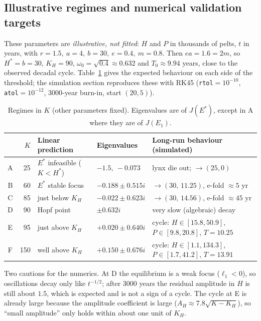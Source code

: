 \subsection{Illustrative regimes and numerical validation targets}\label{sec:joel-regimes}

These parameters are \emph{illustrative, not fitted}: $H$ and $P$ in thousands of pelts, $t$ in
years, with $r=1.5,\ a=4,\ b=30,\ e=0.4,\ m=0.8$. Then $ea=1.6=2m$, so $H^*=b=30$, $K_H=90$,
$\omega_0=\sqrt{0.4}\approx0.632$ and $T_0\approx9.94$ years, close to the observed decadal
cycle. Table~\ref{tab:joel-regimes} gives the expected behaviour on each side of the threshold;
the simulation section reproduces these with RK45 (\texttt{rtol}$=10^{-10}$,
\texttt{atol}$=10^{-12}$, 3000-year burn-in, start $(20,5)$).

\begin{table}[ht]
\centering
\small
\caption{Regimes in $K$ (other parameters fixed). Eigenvalues are of $J(E^*)$, except in A where
they are of $J(E_1)$.}
\label{tab:joel-regimes}
\setlength{\tabcolsep}{4pt}
\begin{tabular}{@{}cr l l l@{}}
\toprule
 & $K$ & Linear prediction & Eigenvalues & Long-run behaviour (simulated)\\
\midrule
A & 25  & $E^*$ infeasible ($K<H^*$) & $-1.5,\ -0.073$ & lynx die out; $\to(25,0)$\\
B & 60  & $E^*$ stable focus & $-0.188\pm0.515i$ & $\to(30,\,11.25)$, e-fold $\approx5$ yr\\
C & 85  & just below $K_H$ & $-0.022\pm0.623i$ & $\to(30,\,14.56)$, e-fold $\approx45$ yr\\
D & 90  & Hopf point & $\pm0.632i$ & very slow (algebraic) decay\\
E & 95  & just above $K_H$ & $+0.020\pm0.640i$ & cycle: $H\in[15.8,50.9]$, $P\in[9.8,20.8]$, $T=10.25$\\
F & 150 & well above $K_H$ & $+0.150\pm0.676i$ & cycle: $H\in[1.1,134.3]$, $P\in[1.7,41.2]$, $T=13.91$\\
\bottomrule
\end{tabular}
\end{table}

\noindent Two cautions for the numerics. At D the equilibrium is a weak focus ($\ell_1<0$), so
oscillations decay only like $t^{-1/2}$; after 3000 years the residual amplitude in $H$ is still
about $1.5$, which is expected and is not a sign of a cycle. The cycle at E is already large
because the amplitude coefficient is large ($A_H\approx7.8\sqrt{K-K_H}$), so ``small
amplitude'' only holds within about one unit of $K_H$.

